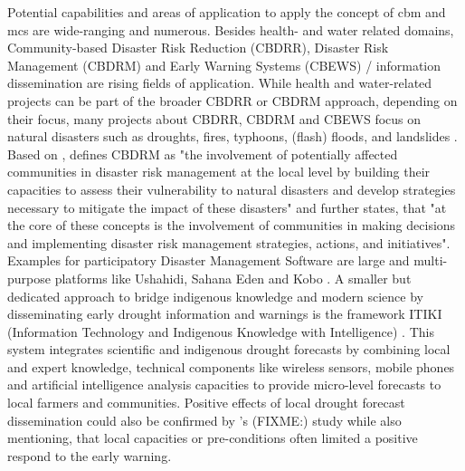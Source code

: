 {Potential capabilities and areas of application to apply the concept of \acrshort*{cbm} and \acrshort*{mcs} are wide-ranging and numerous. Besides health- and water related domains, Community-based Disaster Risk Reduction (CBDRR), Disaster Risk Management (CBDRM) and Early Warning Systems (CBEWS) / information dissemination are rising fields of application. While health and water-related projects can be part of the broader CBDRR or CBDRM approach, depending on their focus, many projects about CBDRR, CBDRM and CBEWS focus on natural disasters such as droughts, fires, typhoons, (flash) floods, and landslides \autocite{machereraReviewStudiesCommunity2016,manaloBellBottleTechnology2013,pinedaRedefiningCommunityBased2015,smithCommunitybasedEarlyWarning2017,tarchianiCommunityImpactBased2020,trogrlicIndigenousKnowledgeEarly2018,vhumbunuCountingDayZero2021}. Based on \autocite{unisdrUNISDRTerminologyDisaster2009}, \autocite[198]{vhumbunuCountingDayZero2021} defines CBDRM as "the involvement of potentially affected communities in disaster risk management at the local level by building their capacities to assess their vulnerability to natural disasters and develop strategies necessary to mitigate the impact of these disasters" and further states, that "at the core of these concepts is the involvement of communities in making decisions and implementing disaster risk management strategies, actions, and initiatives".
Examples for participatory Disaster Management Software are large and multi-purpose platforms like Ushahidi, Sahana Eden and Kobo \autocite{koboorganizationKoboToolbox,sahanafoundationSahanaEDEN2016,ushahidiCrowdsourcingSolutionsEmpower}. A smaller but dedicated approach to bridge indigenous knowledge and modern science by disseminating early drought information and warnings is the framework ITIKI (Information Technology and Indigenous Knowledge with Intelligence) \autocite{akanbiDevelopmentRuleBasedDrought2018,masindeEffectiveDroughtEarly2014a,masindeImplementationRoadmapDownscaling2013,masindeDownscalingAfricaDrought2018,masindeFrameworkPredictingDroughts2010a,masindeITIKIBridgeAfrican2012,masindeITIKIMobileBased2019,nyetanyaneIntegrationIndigenousKnowledge2020,thothelaSurveyIntelligentAgroclimate2021a}. This system integrates scientific and indigenous drought forecasts by combining local and expert knowledge, technical components like wireless sensors, mobile phones and artificial intelligence analysis capacities to provide micro-level forecasts to local farmers and communities. Positive effects of local drought forecast dissemination could also be confirmed by \autocite{anderssonLocalEarlyWarning2020}'s (FIXME:) study while also mentioning, that local capacities or pre-conditions often limited a positive respond to the early warning.
}
